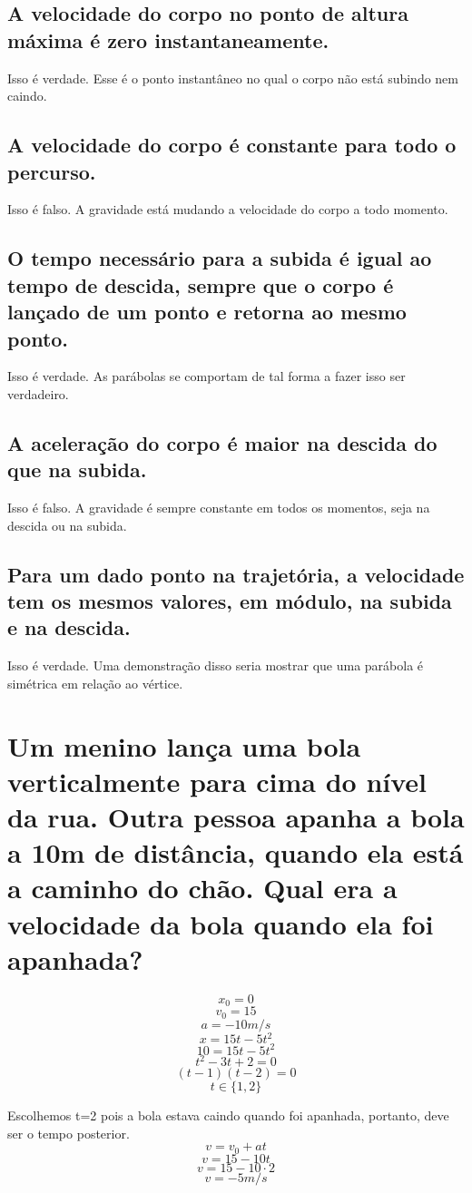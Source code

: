 \documentclass{article}
\begin{document}
    \subsection{A velocidade do corpo no ponto de altura máxima é zero instantaneamente.}
    \hspace{\parindent}Isso é verdade. Esse é o ponto instantâneo no qual o corpo não está subindo nem caindo.
    \subsection{A velocidade do corpo é constante para todo o percurso.}
    \hspace{\parindent}Isso é falso. A gravidade está mudando a velocidade do corpo a todo momento.
    \subsection{O tempo necessário para a subida é igual ao tempo de descida, sempre que o corpo é lançado de um ponto e retorna ao mesmo ponto.}
    \hspace{\parindent}Isso é verdade. As parábolas se comportam de tal forma a fazer isso ser verdadeiro.
    \subsection{A aceleração do corpo é maior na descida do que na subida.}
    \hspace{\parindent}Isso é falso. A gravidade é sempre constante em todos os momentos, seja na descida ou na subida.
    \subsection{Para um dado ponto na trajetória, a velocidade tem os mesmos valores, em módulo, na subida e na descida.}
    \hspace{\parindent}Isso é verdade. Uma demonstração disso seria mostrar que uma parábola é simétrica em relação ao vértice.

\section{Um menino lança uma bola verticalmente para cima do nível da rua. Outra pessoa apanha a bola a 10m de distância, quando ela está a caminho do chão. Qual era a velocidade da bola quando ela foi apanhada?}
    \[x_0=0\]
    \[v_0=15\]
    \[a=-10m/s\]
    \[x=15t-5t^2\]
    \[10=15t-5t^2\]
    \[t^2-3t+2=0\]
    \[(t-1)(t-2)=0\]
    \[t\in\{1,2\}\]
    \par Escolhemos t=2 pois a bola estava caindo quando foi apanhada, portanto, deve ser o tempo posterior.
    \[v=v_0+at\]
    \[v=15-10t\]
    \[v=15-10\cdot 2\]
    \[v=-5m/s\]
    
\end{document}
